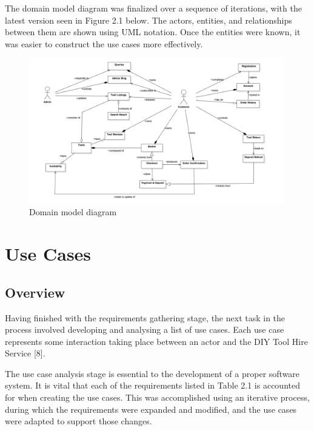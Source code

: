 \documentclass[fontsize=11pt]{extarticle}
\numberwithin{figure}{section} %
\numberwithin{table}{section}%
\begin{document}
The domain model diagram was finalized over a sequence of iterations,
with the latest version seen in Figure 2.1 below. The actors, entities,
and relationships between them are shown using UML notation. Once the
entities were known, it was easier to construct the use cases more
effectively.

\begin{figure}[H]
      \centering
      \includegraphics[trim = 0 0 0 0, clip, width=0.99\textwidth]{TempImg/domain.png}
      \caption{Domain model diagram}
 \end{figure}

\newpage

\hypertarget{use-cases}{%
\section{Use Cases}\label{use-cases}}

\hypertarget{overview-1}{%
\subsection{Overview}\label{overview-1}}

Having finished with the requirements gathering stage, the next task in
the process involved developing and analysing a list of use cases. Each
use case represents some interaction taking place between an actor and
the DIY Tool Hire Service {[}8{]}.

The use case analysis stage is essential to the development of a proper
software system. It is vital that each of the requirements listed in
Table 2.1 is accounted for when creating the use cases. This was
accomplished using an iterative process, during which the requirements
were expanded and modified, and the use cases were adapted to support
those changes.
\end{document}
